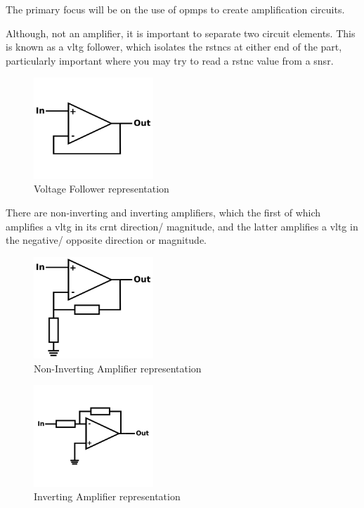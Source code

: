 \documentclass[a4paper,11pt]{report}
\begin{document}
The primary focus will be on the use of \gls{opmp}s to create amplification circuits.

Although, not an amplifier, it is important to separate two circuit elements. This is known as a \gls{vltg} follower, which isolates the \gls{rstnc}s at either end of the part, particularly important where you may try to read a \gls{rstnc} value from a \gls{snsr}.

\begin{figure}[H]
\centering
\includegraphics[width=0.4\textwidth]{voltagefollower}
\caption{Voltage Follower representation}
\end{figure}

There are non-inverting and inverting amplifiers, which the first of which amplifies a \gls{vltg} in its \gls{crnt} direction/ magnitude, and the latter amplifies a \gls{vltg} in the negative/ opposite direction or magnitude.

\begin{figure}[H]
\centering
\includegraphics[width=0.4\textwidth]{noninvertingamp}
\caption{Non-Inverting Amplifier representation}
\end{figure}

\begin{figure}[H]
\centering
\includegraphics[width=0.4\textwidth]{invertingamp}
\caption{Inverting Amplifier representation}
\end{figure}
\end{document}
